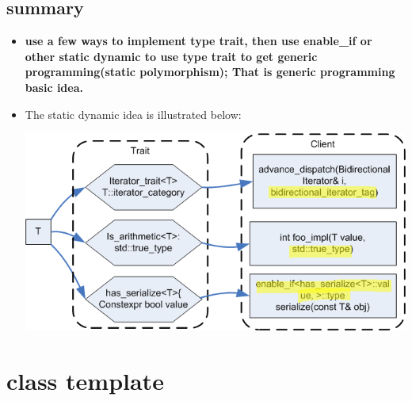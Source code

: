\documentclass[a4paper,11pt,twoside]{book}
\begin{document}
\subsection{summary}
\begin{itemize}
	\item \textbf{use a few ways to implement type trait, then use enable\_if or other static dynamic to use type trait to get generic programming(static polymorphism); That is generic programming basic idea.}
	\item The static dynamic idea is illustrated below:

\begin{center}
	\includegraphics[scale=0.9]{pics/tag_dispatch.png}
\end{center}
	
\end{itemize}

\section{class template}
\end{document}
